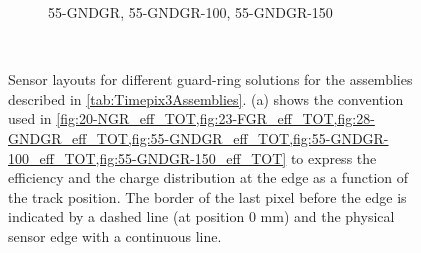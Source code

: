 \begin{figure}[htbp]
\begin{subfigure}[t]{0.5\textwidth}
\begin{tikzpicture}
    \end{tikzpicture}
    \caption{55-GNDGR, 55-GNDGR-100, 55-GNDGR-150}
    \label{fig:Layout50_GNDGR}
  \end{subfigure}~
  \caption{Sensor layouts for different guard-ring solutions for the
    assemblies described in \cref{tab:Timepix3Assemblies}. (a) shows
    the convention used in
    \cref{fig:20-NGR_eff_TOT,fig:23-FGR_eff_TOT,fig:28-GNDGR_eff_TOT,fig:55-GNDGR_eff_TOT,fig:55-GNDGR-100_eff_TOT,fig:55-GNDGR-150_eff_TOT}
    to express the efficiency and the charge distribution at the edge
    as a function of the track position. The border of the last pixel
    before the edge is indicated by a dashed line (at position 0 mm)
    and the physical sensor edge with a continuous line.}
  \label{fig:Layout_guard_ring}
\end{figure}




